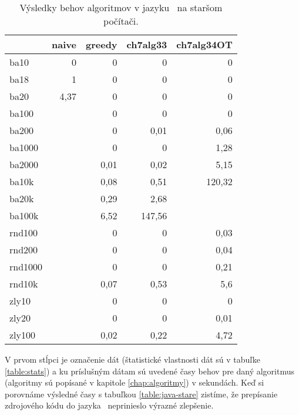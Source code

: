 \begin{table}[h]
	\centering
	\caption{Výsledky behov algoritmov v jazyku \cpp\ na staršom počítači.}
	\begin{tabular}{l|rrrr}
		\hline
		& naive & greedy & ch7alg33 & ch7alg34OT \\ \hline
		ba10    & 0     & 0      & 0        & 0          \\
		ba18    & 1     & 0      & 0        & 0          \\
		ba20    & 4,37  & 0      & 0        & 0          \\
		ba100   &       & 0      & 0        & 0          \\
		ba200   &       & 0      & 0,01     & 0,06       \\
		ba1000  &       & 0      & 0        & 1,28       \\
		ba2000  &       & 0,01   & 0,02     & 5,15       \\
		ba10k   &       & 0,08   & 0,51     & 120,32     \\
		ba20k   &       & 0,29   & 2,68     &            \\
		ba100k  &       & 6,52   & 147,56   &            \\
		rnd100  &       & 0      & 0        & 0,03       \\
		rnd200  &       & 0      & 0        & 0,04       \\
		rnd1000 &       & 0      & 0        & 0,21       \\
		rnd10k  &       & 0,07   & 0,53     & 5,6        \\
		zly10   &       & 0      & 0        & 0          \\
		zly20   &       & 0      & 0        & 0,01       \\
		zly100  &       & 0,02   & 0,22     & 4,72       \\ \hline
	\end{tabular}
	\bigskip\par
	V prvom stĺpci je označenie dát (štatistické vlastnosti dát sú v tabuľke 
	\ref{table:stats}) a ku príslušným dátam sú uvedené časy behov pre daný 
	algoritmus (algoritmy sú popísané v kapitole \ref{chap:algoritmy}) v 
	sekundách. Keď si porovnáme výsledné časy s tabuľkou 
	\ref{table:java-stare} zistíme, že prepísanie zdrojového kódu do jazyka 
	\cpp\ neprinieslo výrazné zlepšenie.
	\label{table:cpp}
\end{table}

